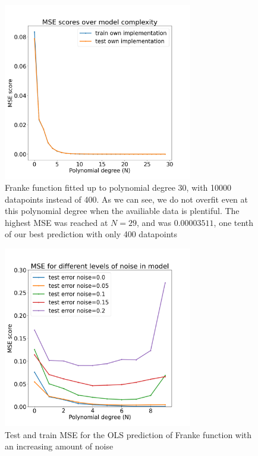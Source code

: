 \documentclass[twocolumn,10pt,cleanfoot]{asme2ej}
\begin{document}
\begin{figure}
\centerline{\includegraphics[width=3.25in]{figure/frankiehigherdatapoints.png}}
\caption{Franke function fitted up to polynomial degree 30, with 10000 datapoints instead of 400. As we can see, we do not overfit even at this polynomial degree when the availiable data is plentiful. The highest MSE was reached at $N=29$, and was $0.00003511$, one tenth of our best prediction with only 400 datapoints}
\label{frankiehigherdatapoints}
\end{figure}

\begin{figure}
\centerline{\includegraphics[width=3.25in]{figure/frankienoisecomparison.png}}
\caption{Test and train MSE for the OLS prediction of Franke function with an increasing amount of noise}
\label{frankienoisecomparison}
\end{figure}
\end{document}
